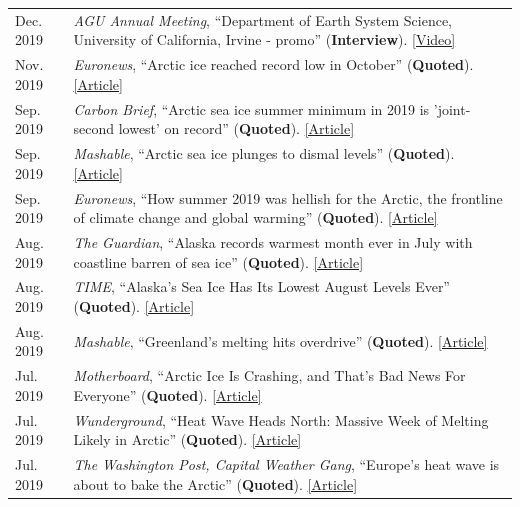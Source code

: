\documentclass[margin,line,palatino,courier,10pt]{res}
\begin{document}
\begin{resume}
\begin{tabular}{@{}p{0.9in}p{4in}}
Dec. 2019 & \textit{AGU Annual Meeting}, ``Department of Earth System Science, University of California, Irvine - promo'' (\textbf{Interview}). \href{https://www.youtube.com/watch?v=QSDRbSkJeqg&feature=youtu.be}{[Video]}\\
Nov. 2019 & \textit{Euronews}, ``Arctic ice reached record low in October'' (\textbf{Quoted}). \href{https://www.euronews.com/2019/11/04/arctic-ice-reached-record-low-in-october}{[Article]}\\
Sep. 2019 & \textit{Carbon Brief}, ``Arctic sea ice summer minimum in 2019 is 'joint-second lowest' on record'' (\textbf{Quoted}). \href{https://www.carbonbrief.org/arctic-sea-ice-minimum-in-2019-is-joint-second-lowest-on-record}{[Article]}\\
Sep. 2019 & \textit{Mashable}, ``Arctic sea ice plunges to dismal levels'' (\textbf{Quoted}). \href{https://mashable.com/article/arctic-sea-ice-2019-melt/}{[Article]}\\
Sep. 2019 & \textit{Euronews}, ``How summer 2019 was hellish for the Arctic, the frontline of climate change and global warming'' (\textbf{Quoted}). \href{https://www.euronews.com/2019/09/18/how-2019-was-hellish-for-the-arctic-the-frontline-of-climate-change-and-global-warming}{[Article]}\\
Aug. 2019 & \textit{The Guardian}, ``Alaska records warmest month ever in July with coastline barren of sea ice'' (\textbf{Quoted}). \href{https://www.theguardian.com/us-news/2019/aug/08/alaska-warmest-month-ever-july-2019-sea-ice}{[Article]}\\
Aug. 2019 & \textit{TIME}, ``Alaska's Sea Ice Has Its Lowest August Levels Ever'' (\textbf{Quoted}). \href{https://time.com/5646168/alaska-sea-ice-melted/}{[Article]}\\
Aug. 2019 & \textit{Mashable}, ``Greenland's melting hits overdrive'' (\textbf{Quoted}). \href{https://mashable.com/article/greenland-melting-spike-climate-change/}{[Article]}\\
Jul. 2019 & \textit{Motherboard}, ``Arctic Ice Is Crashing, and That's Bad News For Everyone'' (\textbf{Quoted}). \href{https://www.vice.com/en_us/article/qv7gzm/arctic-ice-is-crashing-and-thats-bad-news-for-everyone}{[Article]}\\
Jul. 2019 & \textit{Wunderground}, ``Heat Wave Heads North: Massive Week of Melting Likely in Arctic'' (\textbf{Quoted}). \href{https://www.wunderground.com/cat6/Heat-Wave-Heads-North-Massive-Week-Melting-Likely-Arctic}{[Article]}\\
Jul. 2019 & \textit{The Washington Post, Capital Weather Gang}, ``Europe's heat wave is about to bake the Arctic'' (\textbf{Quoted}). \href{https://www.washingtonpost.com/weather/2019/07/26/europes-heat-wave-is-about-bake-arctic/?utm_term=.f57032deb299}{[Article]}\\

\end{tabular}
\end{resume}
\end{document}
